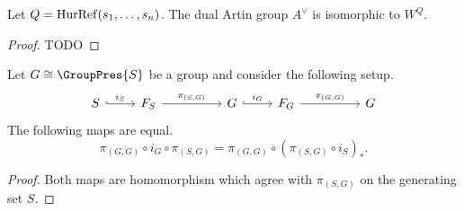 \begin{lemma}
	\label{lem:dual_artin_W_Q_isomorphism}
	Let $Q=\operatorname{HurRef}(s_1,\ldots,s_n)$.
	The dual Artin group $A^\vee$ is isomorphic to $W^Q$.
\end{lemma}
\begin{proof}
	TODO
\end{proof}
\begin{lemma}
	Let $G \cong \GroupPres{S}$ be a group and consider the following setup.
	\[
		\begin{tikzcd}
			S \ar[r, hook, "i_S"] & F_S \ar[rr, "\pi_{(S,G)}"] & & G \ar[r, hook, "i_G"] & F_G \ar[rr, "\pi_{(G,G)}"] & & G
		\end{tikzcd}
	\]
	The following maps are equal.
	\[
		\pi_{(G,G)} \circ i_G \circ \pi_{(S,G)} = \pi_{(G,G)} \circ (\pi_{(S,G)} \circ i_S)_*
		.\]
	\label{lem:group_projections}
\end{lemma}

\begin{proof}
	Both maps are homomorphism which agree with $\pi_{\left( S,G\right)}$ on the generating set $S$.
\end{proof}


